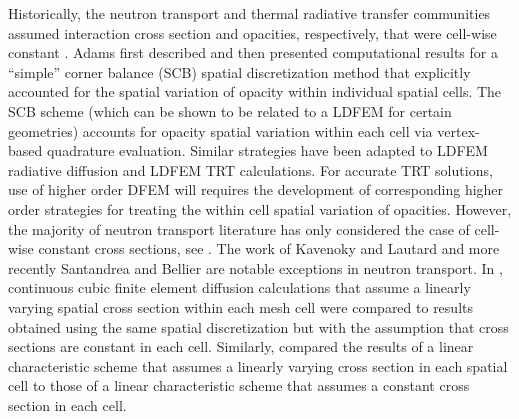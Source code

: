 Historically, the neutron transport and thermal radiative transfer communities assumed interaction cross section and opacities, respectively, that were cell-wise constant \cite{lewis_book,morel_radtran,adams}.
Adams first described \cite{adams_scb} and then presented computational results \cite{adams_nowak} for a ``simple'' corner balance (SCB) spatial discretization method that explicitly accounted for the spatial variation of opacity within individual spatial cells.
The SCB scheme (which can be shown to be related to a LDFEM for certain geometries) accounts for opacity spatial variation within each cell via vertex-based quadrature evaluation.  
Similar strategies have been adapted to LDFEM radiative diffusion \cite{ober_shadid} and LDFEM TRT \cite{warsa_lmfga} calculations.
For accurate TRT solutions, use of higher order DFEM will requires the development of corresponding higher order strategies  for treating the within cell spatial variation of opacities.  
However, the majority of neutron transport literature has only considered the case of cell-wise constant cross sections, see \cite{lewis_book, adams,  yaqi_ragusa2,warsa_krylov}. 
The work of Kavenoky and Lautard \cite{varXS_diff} and more recently Santandrea and Bellier \cite{varXS_MOC} are notable exceptions in neutron transport. 
In \cite{varXS_diff}, continuous cubic finite element diffusion calculations that assume a linearly varying spatial cross section within each mesh cell were compared to results obtained using the same spatial discretization but with the assumption that cross sections are constant in each cell.
Similarly, \cite{varXS_MOC} compared the results of a linear characteristic scheme that assumes a linearly varying cross section in each spatial cell 
to those of a linear characteristic scheme that assumes a constant cross section in each cell.

